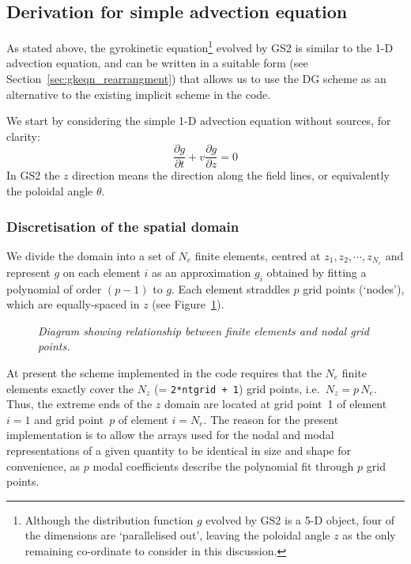 \documentclass[10pt,a4paper]{article}
\newcommand{\dd}{\partial}
\begin{document}
\subsection{Derivation for simple advection equation}

As stated above, the gyrokinetic equation\footnote{Although the distribution
  function $g$ evolved by GS2 is a 5-D object, four of the dimensions are
  `parallelised out', leaving the poloidal angle $z$ as the only remaining
  co-ordinate to consider in this discussion.} evolved by GS2 is similar to
the 1-D advection equation, and can be written in a suitable form (see
Section~\ref{sec:gkeqn_rearrangment}) that allows us to use the DG scheme as
an alternative to the existing implicit scheme in the code.

We start by considering the simple 1-D advection equation without sources, for
clarity:
\begin{equation}
\frac{\dd g}{\dd t} + v \frac{\dd g}{\dd z} = 0
\label{eqn:basicadvection}
\end{equation}
In GS2 the $z$ direction means the direction along the field lines, or
equivalently the poloidal angle $\theta$.

\subsubsection{Discretisation of the spatial domain}

We divide the domain into a set of $N_e$ finite elements, centred at $z_1, z_2,
\cdots , z_{N_e}$ and represent $g$ on each element $i$ as an approximation $g_i$
obtained by fitting a polynomial of order $(p-1)$ to $g$. Each element
straddles $p$ grid points (`nodes'), which are equally-spaced in $z$ (see
Figure~\ref{fig:elements}).

\begin{figure}[ht]
  \begin{center}
  \end{center}
  \caption{\textit{Diagram showing relationship between finite elements
      and nodal grid points.}
    \label{fig:elements} }
\end{figure}

At present the scheme implemented in the code requires that the $N_e$ finite
elements exactly cover the $N_z$ (= \texttt{2*ntgrid + 1}) grid points, i.e.\
$N_z = p\, N_e$. Thus, the extreme ends of the $z$ domain are located at grid
point~1 of element $i=1$ and grid point~$p$ of element $i=N_e$. The reason for
the present implementation is to allow the arrays used for the nodal and modal
representations of a given quantity to be identical in size and shape for
convenience, as $p$ modal coefficients describe the polynomial fit through $p$
grid points.
\end{document}
